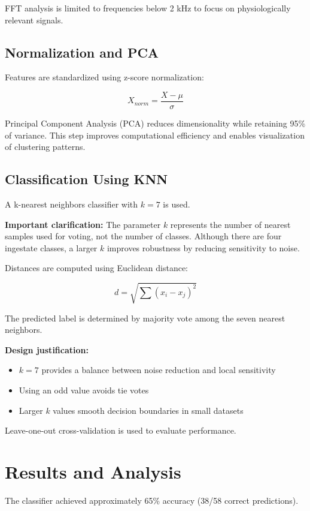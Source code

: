 \documentclass[conference]{IEEEtran}
\begin{document}
FFT analysis is limited to frequencies below 2 kHz to focus on physiologically relevant signals.

\subsection{Normalization and PCA}

Features are standardized using z-score normalization:

\[
X_{norm} = \frac{X - \mu}{\sigma}
\]

Principal Component Analysis (PCA) reduces dimensionality while retaining 95\% of variance. This step improves computational efficiency and enables visualization of clustering patterns.

\subsection{Classification Using KNN}

A k-nearest neighbors classifier with \(k = 7\) is used.

\textbf{Important clarification:}  
The parameter \(k\) represents the number of nearest samples used for voting, not the number of classes. Although there are four ingestate classes, a larger \(k\) improves robustness by reducing sensitivity to noise.

Distances are computed using Euclidean distance:

\[
d = \sqrt{\sum (x_i - x_j)^2}
\]

The predicted label is determined by majority vote among the seven nearest neighbors.

\textbf{Design justification:}
\begin{itemize}
    \item \(k=7\) provides a balance between noise reduction and local sensitivity
    \item Using an odd value avoids tie votes
    \item Larger \(k\) values smooth decision boundaries in small datasets
\end{itemize}

Leave-one-out cross-validation is used to evaluate performance.

\section{Results and Analysis}

The classifier achieved approximately 65\% accuracy (38/58 correct predictions).
\end{document}
